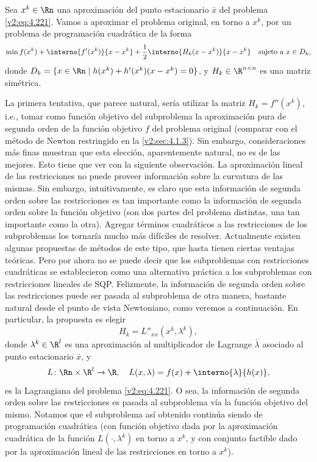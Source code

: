 Sea $x^k \in \Rn$ una aproximación del punto estacionario $\bar{x}$ del problema \eqref{v2:eq:4.221}. Vamos a aproximar el problema original, en torno a $x^k$, por un problema de programación cuadrática de la forma
\begin{equation}
\min f(x^k) + \interno{f'(x^k)}{x - x^k} + \frac{1}{2} \interno{H_k(x - x^k)}{x - x^k} \quad \text{sujeto a } x \in D_k,
\label{v2:eq:4.222}
\end{equation}
donde $D_k = \{ x \in \Rn \mid h(x^k) + h'(x^k)(x - x^k) = 0 \}$, y $H_k \in \R^{n \times n}$ es una matriz simétrica.

La primera tentativa, que parece natural, sería utilizar la matriz $H_k = f''(x^k)$, i.e., tomar como función objetivo del subproblema la aproximación pura de segunda orden de la función objetivo $f$ del problema original (comparar con el método de Newton restringido en la \cref{v2:sec:4.1.3}). Sin embargo, consideraciones más finas muestran que esta elección, aparentemente natural, no es de las mejores. Esto tiene que ver con la siguiente observación. La aproximación lineal de las restricciones no puede proveer información sobre la curvatura de las mismas. Sin embargo, intuitivamente, es claro que esta información de segunda orden sobre las restricciones es tan importante como la información de segunda orden sobre la función objetivo (son dos partes del problema distintas, una tan importante como la otra). Agregar términos cuadráticos a las restricciones de los subproblemas los tornaría mucho más difíciles de resolver. Actualmente existen algunas propuestas de métodos de este tipo, que hasta tienen ciertas ventajas teóricas. Pero por ahora no se puede decir que los subproblemas con restricciones cuadráticas se establecieron como una alternativa práctica a los subproblemas con restricciones lineales de SQP. Felizmente, la información de segunda orden sobre las restricciones puede ser pasada al subproblema de otra manera, bastante natural desde el punto de vista Newtoniano, como veremos a continuación. En particular, la propuesta es elegir
\begin{equation}
H_k = L''_{xx}(x^k, \lambda^k),
\label{v2:eq:4.223}
\end{equation}
donde $\lambda^k \in \R^l$ es una aproximación al multiplicador de Lagrange $\bar{\lambda}$ asociado al punto estacionario $\bar{x}$, y
\[
L \colon \Rn \times \R^l \to \R, \quad L(x, \lambda) = f(x) + \interno{\lambda}{h(x)},
\]
es la Lagrangiana del problema \eqref{v2:eq:4.221}. O sea, la información de segunda orden sobre las restricciones es pasada al subproblema vía la función objetivo del mismo. Notamos que el subproblema así obtenido continúa siendo de programación cuadrática (con función objetivo dada por la aproximación cuadrática de la función $L(\cdot, \lambda^k)$ en torno a $x^k$, y con conjunto factible dado por la aproximación lineal de las restricciones en torno a $x^k$).

